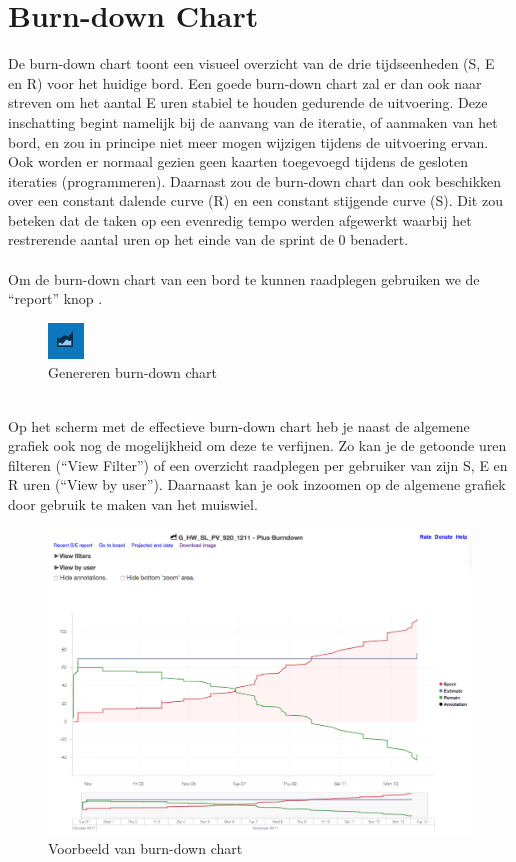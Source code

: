 \section{Burn-down Chart}

De burn-down chart toont een visueel overzicht van de drie tijdseenheden (S, E en R) voor het huidige bord. Een goede burn-down chart zal er dan ook naar streven om het aantal E uren stabiel te houden gedurende de uitvoering. Deze inschatting begint namelijk bij de aanvang van de iteratie, of aanmaken van het bord, en zou in principe niet meer mogen wijzigen tijdens de uitvoering ervan. Ook worden er normaal gezien geen kaarten toegevoegd tijdens de gesloten iteraties (programmeren). Daarnast zou de burn-down chart dan ook beschikken over een constant dalende curve (R) en een constant stijgende curve (S). Dit zou beteken dat de taken op een evenredig tempo werden afgewerkt waarbij het restrerende aantal uren op het einde van de sprint de 0 benadert.
\\\\
Om de burn-down chart van een bord te kunnen raadplegen gebruiken we de ``report'' knop . 
\begin{figure}[h]
	\centering
	\includegraphics[scale=0.5]{./afbeeldingen/burndownknop.png}
	\caption{Genereren burn-down chart}
	\label{fig:burndownknop}	
\end{figure} 
\noindent
\\Op het scherm met de effectieve burn-down chart  heb je naast de algemene grafiek ook nog de mogelijkheid om deze te verfijnen. Zo kan je de getoonde uren filteren (``View Filter'') of een overzicht raadplegen per gebruiker van zijn S, E en R uren (``View by user''). Daarnaast kan je ook inzoomen op de algemene grafiek door gebruik te maken van het muiswiel.

\begin{figure}[H]
	\centering
	\includegraphics[scale=0.26]{./afbeeldingen/burndownchart.png}
	\caption{Voorbeeld van burn-down chart}
	\label{fig:burndownchart}	
\end{figure} 